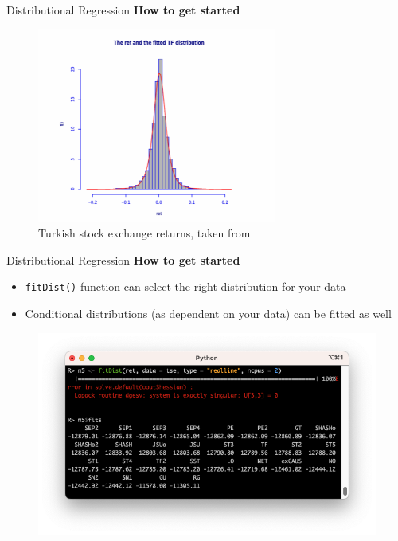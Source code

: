 \documentclass[t]{beamer} 	%
\begin{document}
\begin{frame}{Distributional Regression}
	\textbf{How to get started} \\
	\begin{figure}
		\centering
		\includegraphics[width=0.7\textwidth]{images/turkish_stock.png}
		\caption{Turkish stock exchange returns, taken from \citet{gamlssbook}}
	\end{figure}
\end{frame}

\begin{frame}{Distributional Regression}
	\textbf{How to get started} \\
	\begin{itemize}
		\item \texttt{fitDist()} function can select the right distribution for your data
		\item Conditional distributions (as dependent on your data) can be fitted as well
	\end{itemize}
	\begin{figure}
		\centering
		\includegraphics[width=\textwidth]{images/fitdist_gamlss.png}
	\end{figure}
\end{frame}
\end{document}
